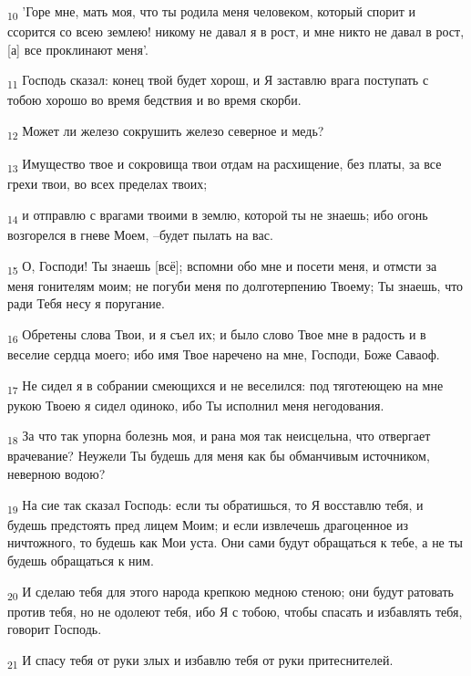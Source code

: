 \begin{tcolorbox}
\textsubscript{10} 'Горе мне, мать моя, что ты родила меня человеком, который спорит и ссорится со всею землею! никому не давал я в рост, и мне никто не давал в рост, [а] все проклинают меня'.
\end{tcolorbox}
\begin{tcolorbox}
\textsubscript{11} Господь сказал: конец твой будет хорош, и Я заставлю врага поступать с тобою хорошо во время бедствия и во время скорби.
\end{tcolorbox}
\begin{tcolorbox}
\textsubscript{12} Может ли железо сокрушить железо северное и медь?
\end{tcolorbox}
\begin{tcolorbox}
\textsubscript{13} Имущество твое и сокровища твои отдам на расхищение, без платы, за все грехи твои, во всех пределах твоих;
\end{tcolorbox}
\begin{tcolorbox}
\textsubscript{14} и отправлю с врагами твоими в землю, которой ты не знаешь; ибо огонь возгорелся в гневе Моем, --будет пылать на вас.
\end{tcolorbox}
\begin{tcolorbox}
\textsubscript{15} О, Господи! Ты знаешь [всё]; вспомни обо мне и посети меня, и отмсти за меня гонителям моим; не погуби меня по долготерпению Твоему; Ты знаешь, что ради Тебя несу я поругание.
\end{tcolorbox}
\begin{tcolorbox}
\textsubscript{16} Обретены слова Твои, и я съел их; и было слово Твое мне в радость и в веселие сердца моего; ибо имя Твое наречено на мне, Господи, Боже Саваоф.
\end{tcolorbox}
\begin{tcolorbox}
\textsubscript{17} Не сидел я в собрании смеющихся и не веселился: под тяготеющею на мне рукою Твоею я сидел одиноко, ибо Ты исполнил меня негодования.
\end{tcolorbox}
\begin{tcolorbox}
\textsubscript{18} За что так упорна болезнь моя, и рана моя так неисцельна, что отвергает врачевание? Неужели Ты будешь для меня как бы обманчивым источником, неверною водою?
\end{tcolorbox}
\begin{tcolorbox}
\textsubscript{19} На сие так сказал Господь: если ты обратишься, то Я восставлю тебя, и будешь предстоять пред лицем Моим; и если извлечешь драгоценное из ничтожного, то будешь как Мои уста. Они сами будут обращаться к тебе, а не ты будешь обращаться к ним.
\end{tcolorbox}
\begin{tcolorbox}
\textsubscript{20} И сделаю тебя для этого народа крепкою медною стеною; они будут ратовать против тебя, но не одолеют тебя, ибо Я с тобою, чтобы спасать и избавлять тебя, говорит Господь.
\end{tcolorbox}
\begin{tcolorbox}
\textsubscript{21} И спасу тебя от руки злых и избавлю тебя от руки притеснителей.
\end{tcolorbox}
